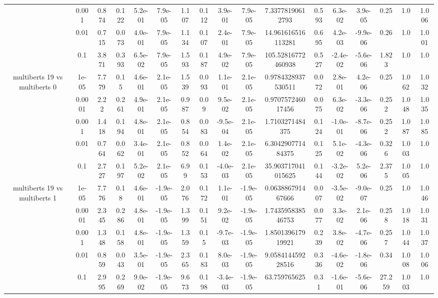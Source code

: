 \begin{tabular}{|c|c|c|c|c|c|c|c|c|c|c|c|c|c|c|c|c|}
 & 0.001 & 0.874 & 0.122 & 5.2e-01 & 7.9e-05 & 1.107 & 0.112 & 3.9e-01 & 7.9e-05 & 7.33778190612793 & 0.593 & 6.3e-02 & 3.9e-05 & 0.25 & 1.0 & 1.006 \\
 & 0.01 & 0.715 & 0.073 & 4.0e-01 & 7.9e-05 & 1.134 & 0.107 & 2.4e-01 & 7.9e-05 & 14.961616516113281 & 0.695 & 4.2e-03 & -9.9e-06 & 0.26 & 1.0 & 1.001 \\
 & 0.1 & 3.871 & 0.393 & 6.5e-02 & 7.9e-05 & 1.593 & 0.187 & 4.9e-02 & 7.9e-05 & 105.52816772460938 & 0.527 & -2.4e-02 & -5.6e-06 & 1.823 & 1.0 & 1.0 \\
\hline
\multirow{5}{*}{multiberts 19 vs multiberts 0} & 1e-05 & 7.779 & 0.15 & 4.6e-01 & 2.1e-05 & 1.539 & 0.093 & 1.1e-01 & 2.1e-05 & 0.9784328937530511 & 0.072 & 2.8e-01 & 4.2e-06 & 0.25 & 1.062 & 1.032 \\
 & 0.0001 & 2.22 & 0.261 & 4.9e-01 & 2.1e-05 & 0.987 & 0.09 & 9.5e-02 & 2.1e-05 & 0.970757246017456 & 0.075 & 6.3e-02 & -3.3e-06 & 0.252 & 1.048 & 1.035 \\
 & 0.001 & 1.418 & 0.194 & 4.8e-01 & 2.1e-05 & 0.854 & 0.083 & -9.5e-04 & 2.1e-05 & 1.7103271484375 & 0.124 & -1.0e-01 & -8.7e-06 & 0.252 & 1.087 & 1.085 \\
 & 0.01 & 0.764 & 0.062 & 3.4e-01 & 2.1e-05 & 0.852 & 0.064 & 1.4e-02 & 2.1e-05 & 6.304290771484375 & 0.125 & 5.1e-02 & -4.3e-06 & 0.326 & 1.003 & 1.0 \\
 & 0.1 & 2.727 & 0.197 & 5.2e-02 & 2.1e-05 & 6.99 & 0.153 & -4.0e-03 & 2.1e-05 & 35.903717041015625 & 0.144 & -3.2e-02 & 5.2e-06 & 2.375 & 1.005 & 1.0 \\
\hline
\multirow{5}{*}{multiberts 19 vs multiberts 1} & 1e-05 & 7.776 & 0.18 & 4.6e-01 & -1.9e-05 & 2.076 & 0.172 & 1.1e-01 & -1.9e-05 & 0.063886791467666 & 0.007 & -3.5e-02 & -9.0e-07 & 0.25 & 1.0 & 1.046 \\
 & 0.0001 & 2.345 & 0.286 & 4.8e-01 & -1.9e-05 & 1.399 & 0.151 & 9.2e-02 & -1.9e-05 & 1.743595838546753 & 0.077 & 3.3e-02 & 2.1e-06 & 0.258 & 1.018 & 1.031 \\
 & 0.001 & 1.348 & 0.158 & 4.8e-01 & -1.9e-05 & 1.359 & 0.15 & -9.7e-03 & -1.9e-05 & 1.850139617919921 & 0.239 & 3.8e-02 & -4.7e-06 & 0.257 & 1.044 & 1.037 \\
 & 0.01 & 0.859 & 0.043 & 3.5e-01 & -1.9e-05 & 2.365 & 0.183 & 8.0e-03 & -1.9e-05 & 9.058414459228516 & 0.336 & -4.6e-02 & -1.8e-06 & 0.34 & 1.008 & 1.006 \\
 & 0.1 & 2.995 & 0.269 & 9.0e-02 & -1.9e-05 & 9.673 & 0.198 & -3.4e-03 & -1.9e-05 & 63.759765625 & 0.31 & -1.6e-01 & -5.6e-06 & 27.259 & 1.003 & 1.0 \\

\end{tabular}
